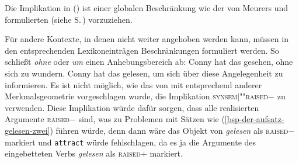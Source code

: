 {Die Implikation in () ist einer globalen Beschränkung wie der von Meurers und \prz
formulierten (siehe S.\,\pageref{raised-wert}) vorzuziehen.

Für andere Kontexte, in denen nicht weiter angehoben werden kann, müssen in den entsprechenden
Lexikoneinträgen Beschränkungen formuliert werden. So schließt \zb \emph{ohne} oder \emph{um}
einen Anhebungsbereich ab:
\eal
\ex Conny hat das gesehen, ohne sich zu wundern.
\ex Conny hat das gelesen, um sich über diese Angelegenheit zu informieren.
\zl
Es ist nicht möglich, wie das von \citet[, Fußnote~54]{MdK2001a} mit entsprechend
anderer Merkmalsgeometrie vorgeschlagen wurde, die Implikation  \impl \textsc{synsem$|$""raised}$-$
zu verwenden. Diese Implikation würde dafür sorgen, dass alle realisierten Argumente \textsc{raised}$-$
sind, was zu Problemen mit Sätzen wie (\ref{bsp-der-aufsatz-gelesen-zwei}) führen würde, denn dann
wäre das Objekt von \emph{gelesen} als \textsc{raised}$-$ markiert und \texttt{attract} würde
fehlschlagen, da es ja die Argumente des eingebetteten Verbs \emph{gelesen} als \textsc{raised}$+$
markiert.

}
